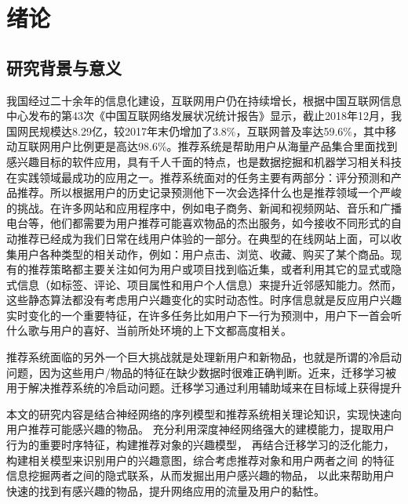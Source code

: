 \chapter{绪论}
\section{研究背景与意义}

我国经过二十余年的信息化建设，互联网用户仍在持续增长，根据中国互联网信息中心发布的第43次《中国互联网络发展状况统计报告》显示，截止2018年12月，我国网民规模达8.29亿，较2017年末仍增加了3.8\%，互联网普及率达59.6\%，其中移动互联网用户比例更是高达98.6\%。推荐系统是帮助用户从海量产品集合里面找到感兴趣目标的软件应用，具有千人千面的特点，也是数据挖掘和机器学习相关科技在实践领域最成功的应用之一。推荐系统面对的任务主要有两部分：评分预测和产品推荐。所以根据用户的历史记录预测他下一次会选择什么也是推荐领域一个严峻的挑战。在许多网站和应用程序中，例如电子商务、新闻和视频网站、音乐和广播电台等，他们都需要为用户推荐可能喜欢物品的杰出服务，如今接收不同形式的自动推荐已经成为我们日常在线用户体验的一部分。在典型的在线网站上面，可以收集用户各种类型的相关动作，例如：用户点击、浏览、收藏、购买了某个商品。现有的推荐策略都主要关注如何为用户或项目找到临近集，或者利用其它的显式或隐式信息（如标签、评论、项目属性和用户个人信息）来提升近邻感知能力。然而，这些静态算法都没有考虑用户兴趣变化的实时动态性。时序信息就是反应用户兴趣实时变化的一个重要特征，在许多任务比如用户下一行为预测中，用户下一首会听什么歌与用户的喜好、当前所处环境的上下文都高度相关。

推荐系统面临的另外一个巨大挑战就是处理新用户和新物品，也就是所谓的冷启动问题，因为这些用户/物品的特征在缺少数据时很难正确判断。近来，迁移学习被用于解决推荐系统的冷启动问题。迁移学习通过利用辅助域来在目标域上获得提升



本文的研究内容是结合神经网络的序列模型和推荐系统相关理论知识，实现快速向用户推荐可能感兴趣的物品。%
充分利用深度神经网络强大的建模能力，提取用户行为的重要时序特征，构建推荐对象的兴趣模型，%
再结合迁移学习的泛化能力，构建相关模型来识别用户的兴趣意图，综合考虑推荐对象和用户两者之间%
的特征信息挖掘两者之间的隐式联系，从而发掘出用户感兴趣的物品，
以此来帮助用户快速的找到有感兴趣的物品，提升网络应用的流量及用户的黏性。%


